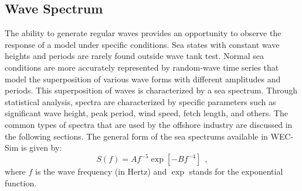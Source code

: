 \subsection{Wave Spectrum}
The ability to generate regular waves provides an opportunity to observe the response of a model
under specific conditions. Sea states with constant wave heights and periods are rarely
found outside wave tank test. Normal sea conditions are more accurately represented
by random-wave time series that model the superposition of various wave forms with different 
amplitudes and periods. This superposition of waves is characterized by a sea spectrum.
Through statistical analysis, spectra are characterized by specific parameters such as significant
wave height, peak period, wind speed, fetch length, and others. The common
types of spectra that are used by the offshore industry are discussed in the following
sections.  The general form of the sea spectrums available in WEC-Sim is given by:
\begin{equation}
S\left( f \right) = A f^{-5}\exp\left[-B f^{-4} \right]~~,
\end{equation}
where $f$ is the wave frequency (in Hertz) and $\exp$ stands for the exponential function.

